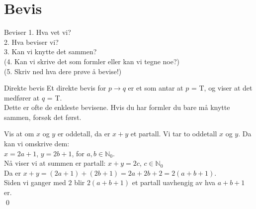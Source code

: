 \section{Bevis}

\begin{frame}{Beviser}
    1. Hva vet vi?\\
    
    2. Hva beviser vi? \\
    
    3. Kan vi knytte det sammen?\\
    
    (4. Kan vi skrive det som formler eller kan vi tegne noe?)\\

    (5. Skriv ned hva dere prøve å bevise!) %
\end{frame}


\begin{frame}{Direkte bevis}
    Et direkte bevis for $p \rightarrow q$ er et som antar at $p$ = T, og viser at det medfører at $q$ = T.\\
    Dette er ofte de enkleste bevisene. Hvis du har formler du bare må knytte sammen, forsøk det først.\\
    
    \pause
    \begin{block}{Vis at om $x$ og $y$ er oddetall, da er $x + y$ et partall.}
        Vi tar to oddetall $x$ og $y$. Da kan vi omskrive dem:\\
        $x = 2a+1$, $y = 2b+1$, for $a, b \in \mathbb{N}_0$.\\
        Nå viser vi at summen er partall: $x+y=2c$, $c \in \mathbb{N}_0$\\
        Da er $x + y = (2a+1) + (2b+1) = 2a + 2b + 2 = 2(a+b+1)$.\\
        Siden vi ganger med $2$ blir $2(a + b + 1)$ et partall uavhengig av hva $a + b + 1$ er.\\
        \qed
    \end{block}
\end{frame}

